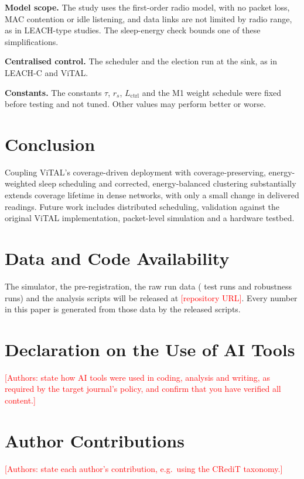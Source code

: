 \documentclass[journal]{IEEEtran}
\newcommand{\todo}[1]{\textcolor{red}{[#1]}}
\begin{document}
\textbf{Model scope.} The study uses the first-order radio model, with no packet loss, MAC contention or idle listening, and data links are not limited by radio range, as in LEACH-type studies. The sleep-energy check bounds one of these simplifications.

\textbf{Centralised control.} The scheduler and the election run at the sink, as in LEACH-C and ViTAL.

\textbf{Constants.} The constants $\tau$, $r_s$, $L_{\mathrm{ctrl}}$ and the M1 weight schedule were fixed before testing and not tuned. Other values may perform better or worse.

\section{Conclusion}
Coupling ViTAL's coverage-driven deployment with coverage-preserving, energy-weighted sleep scheduling and corrected, energy-balanced clustering substantially extends coverage lifetime in dense networks, with only a small change in delivered readings. Future work includes distributed scheduling, validation against the original ViTAL implementation, packet-level simulation and a hardware testbed.

\clearpage
\section*{Data and Code Availability}
The simulator, the pre-registration, the raw run data (\NRuns{} test runs and \NRob{} robustness runs) and the analysis scripts will be released at \todo{repository URL}. Every number in this paper is generated from those data by the released scripts.

\section*{Declaration on the Use of AI Tools}
\todo{Authors: state how AI tools were used in coding, analysis and writing, as required by the target journal's policy, and confirm that you have verified all content.}

\section*{Author Contributions}
\todo{Authors: state each author's contribution, e.g.\ using the CRediT taxonomy.}



\end{document}
